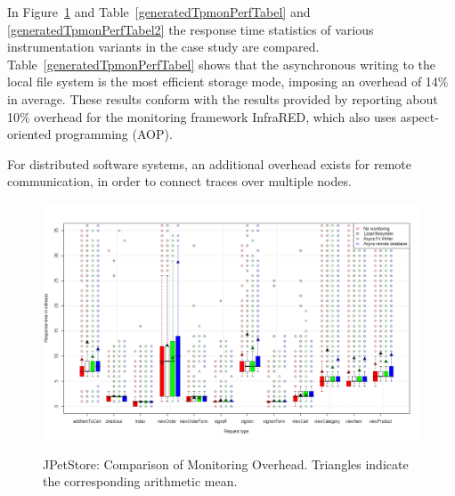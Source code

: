 \documentclass[a4paper,12pt]{scrartcl}
\begin{document}
In Figure~\ref{MonitoringOverhead2} and Table~\ref{generatedTpmonPerfTabel} and  \ref{generatedTpmonPerfTabel2} the response time statistics of various instrumentation variants in the case study are compared. Table~\ref{generatedTpmonPerfTabel} shows that the asynchronous writing to the local file system is the most efficient storage mode, imposing an overhead of 14\% in average. These results conform with the results provided by \citet{GovindrajNarayananThomasNairP06OnUsingAOPforApplicationPerformanceManagement} reporting about 10\% overhead for the monitoring framework InfraRED, which also uses aspect-oriented programming (AOP).

For distributed software systems, an additional overhead exists for remote communication, in order to connect traces over multiple nodes.




\begin{figure}
 \centering
 \includegraphics[width=\textwidth]{MonitoringOverhead2.png}
 \label{MonitoringOverhead2}
 \caption{JPetStore: Comparison of Monitoring Overhead. Triangles indicate the corresponding arithmetic mean.}
\end{figure}
\end{document}
